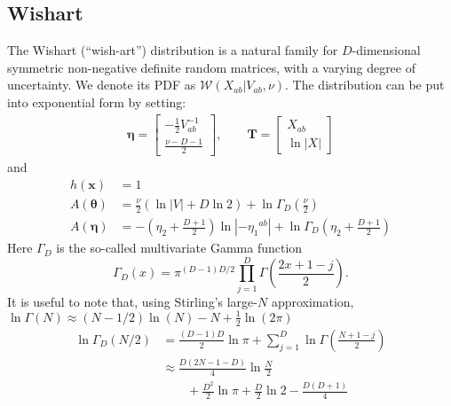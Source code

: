 \documentclass[aps,showpacs,twocolumn,prd,superscriptaddress,nofootinbib]{revtex4}
\newcommand{\be}{\begin{equation}}
\newcommand{\ee}{\end{equation}}
\newcommand{\nn}{\nonumber}
\begin{document}
\subsection{Wishart}
The Wishart (``wish-art'') distribution is a natural family for $D$-dimensional symmetric non-negative definite random matrices, with a varying degree of uncertainty. We denote its PDF as $\mathcal{W}(X_{ab}|V_{ab},\nu)$. The distribution can be put into exponential form by setting:
\begin{align*}
  \bm\eta=
\begin{bmatrix}
  -\frac12V^{-1}_{ab}\\[.7ex]
  \frac{\nu-D-1}2
\end{bmatrix},\qquad
\bm T=
\begin{bmatrix}
  X_{ab}\\[.7ex]
  \ln\left|X\right|
\end{bmatrix}
\end{align*}
and
\begin{align*}
h(\bm x)&=1\\
A(\bm\theta)&=\frac\nu2\left(\ln|V|+D\ln2\right)+\ln \Gamma_D\left(\frac\nu2\right)\\
A(\bm\eta)&=-\!\left(\eta_2+\frac{D+1}2\right)\ln\left|{-{\eta_1}^{ab}}\right|+\ln \Gamma_D\left(\eta_2+\frac{D+1}2\right)
\end{align*}
Here $\Gamma_D$ is the so-called multivariate Gamma function
\be
\Gamma_D\left(x\right)=\pi^{(D-1)D/2}\prod_{j=1}^D{\Gamma\left(\frac{2x+1-j}2\right)}. 
\ee
It is useful to note that, using Stirling's large-$N$ approximation, $\ln\Gamma(N)\approx (N-1/2)\ln(N)-N+\frac12\ln(2\pi)$ 
\begin{align}
  \ln\Gamma_D\left(N/2\right)&=\frac{(D-1)D}{2}\ln\pi+\sum_{j=1}^D{\ln\Gamma\left(\frac{N+1-j}2\right)}\nn\\
  &\approx\frac {D(2N-1-D)}4\ln \frac N2\nn\\
  &\qquad+\frac{D^2}{2}\ln\pi+\frac {D}2\ln 2-\frac{D(D+1)}4\nn\\
\end{align}
\end{document}
